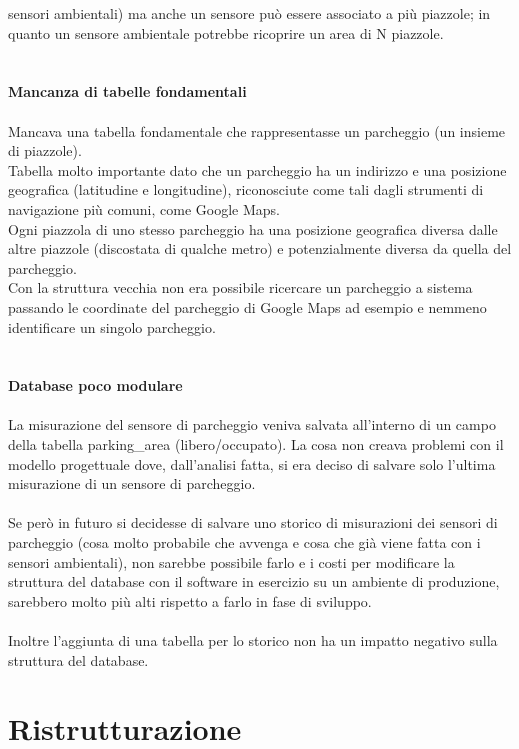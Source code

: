 sensori ambientali) ma anche un sensore può essere associato a più piazzole; in quanto un sensore ambientale
potrebbe ricoprire un area di N piazzole.
\\\\\\
\textbf{Mancanza di tabelle fondamentali}
\\\\
Mancava una tabella fondamentale che rappresentasse un parcheggio (un insieme di piazzole). 
\\
Tabella molto importante dato che un parcheggio ha un indirizzo e una posizione geografica (latitudine e longitudine), 
riconosciute come tali dagli strumenti di navigazione più comuni, come Google Maps. 
\\
Ogni piazzola di uno stesso parcheggio ha una posizione geografica diversa dalle altre piazzole (discostata di qualche 
metro) e potenzialmente diversa da quella del parcheggio. 
\\
Con la struttura vecchia non era possibile ricercare un parcheggio a sistema passando le coordinate del parcheggio di Google
Maps ad esempio e nemmeno identificare un singolo parcheggio.
\\\\\\
\textbf{Database poco modulare}
\\\\
La misurazione del sensore di parcheggio veniva salvata all'interno di un campo della tabella parking\_area (libero/occupato). La cosa non creava problemi con il modello progettuale dove,
dall'analisi fatta, si era deciso di salvare solo l'ultima misurazione di un sensore di parcheggio.
\\\\
Se però in futuro si decidesse di salvare uno storico di misurazioni dei sensori di parcheggio (cosa molto probabile che
avvenga e cosa che già viene fatta con i sensori ambientali), non sarebbe possibile farlo e i costi
per modificare la struttura del database con il software in esercizio su un ambiente di produzione, sarebbero molto più
alti rispetto a farlo in fase di sviluppo.
\\\\
Inoltre l'aggiunta di una tabella per lo storico non ha un impatto negativo sulla struttura del database.
\clearpage
\section{Ristrutturazione}

